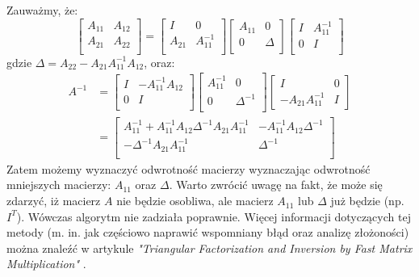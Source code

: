 \documentclass{article}
\begin{document}
Zauważmy, że:
\begin{equation}
\begin{bmatrix}
A_{11} & A_{12} \\
A_{21} & A_{22} \\
\end{bmatrix}
= 
\begin{bmatrix}
I & 0 \\
A_{21} & A_{11}^{-1} \\ 
\end{bmatrix}
\begin{bmatrix}
A_{11} & 0 \\
0 & \Delta \\
\end{bmatrix}
\begin{bmatrix}
I & A_{11}^{-1} \\
0 & I \\
\end{bmatrix}
\end{equation}
gdzie $\Delta = A_{22} - A_{21}A_{11}^{-1}A_{12}$, oraz:
\begin{equation}
\begin{split}
A^{-1}&=
\begin{bmatrix}
I &  -A_{11}^{-1}A_{12} \\
0 & I \\
\end{bmatrix}
\begin{bmatrix}
A_{11}^{-1} & 0 \\
0 & \Delta^{-1} \\
\end{bmatrix}
\begin{bmatrix}
I & 0 \\
-A_{21}A_{11}^{-1} & I
\end{bmatrix} \\
&=
\begin{bmatrix}
A_{11}^{-1} + A_{11}^{-1}A_{12}\Delta^{-1}A_{21}A_{11}^{-1} & -A_{11}^{-1}A_{12}\Delta^{-1} \\
-\Delta^{-1}A_{21}A_{11}^{-1} & \Delta^{-1} \\
\end{bmatrix}
\end{split}
\end{equation}
Zatem możemy wyznaczyć odwrotność macierzy wyznaczając odwrotność mniejszych macierzy: $A_{11}$ oraz $\Delta$. Warto zwrócić uwagę na fakt, że może się zdarzyć, iż macierz $A$ nie będzie osobliwa, ale macierz $A_{11}$ lub $\Delta$ już będzie (np. $I^T$). Wówczas algorytm nie zadziała poprawnie. Więcej informacji dotyczących tej metody (m. in. jak częściowo naprawić wspomniany błąd oraz analizę złożoności) można znaleźć w artykule \textit{"Triangular Factorization and Inversion by Fast Matrix Multiplication"} \cite{10.2307/2005828}.
\end{document}
